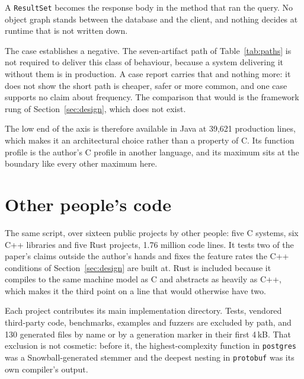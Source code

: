 \documentclass[11pt,a4paper]{article}
\begin{document}
A \texttt{ResultSet} becomes the response body in the method that ran the query. No object graph stands between the database and the client, and nothing decides at runtime that is not written down.

The case establishes a negative. The seven-artifact path of Table~\ref{tab:paths} is not required to deliver this class of behaviour, because a system delivering it without them is in production. A case report carries that and nothing more: it does not show the short path is cheaper, safer or more common, and one case supports no claim about frequency. The comparison that would is the framework rung of Section~\ref{sec:design}, which does not exist.

The low end of the axis is therefore available in Java at 39,621 production lines, which makes it an architectural choice rather than a property of C. Its function profile is the author's C profile in another language, and its maximum sits at the boundary like every other maximum here.

\section{Other people's code}
\label{sec:external}

The same script, over sixteen public projects by other people: five C systems, six C++ libraries and five Rust projects, 1.76 million code lines. It tests two of the paper's claims outside the author's hands and fixes the feature rates the C++ conditions of Section~\ref{sec:design} are built at. Rust is included because it compiles to the same machine model as C and abstracts as heavily as C++, which makes it the third point on a line that would otherwise have two.

Each project contributes its main implementation directory. Tests, vendored third-party code, benchmarks, examples and fuzzers are excluded by path, and 130 generated files by name or by a generation marker in their first 4\,kB. That exclusion is not cosmetic: before it, the highest-complexity function in \texttt{postgres} was a Snowball-generated stemmer and the deepest nesting in \texttt{protobuf} was its own compiler's output.
\end{document}
